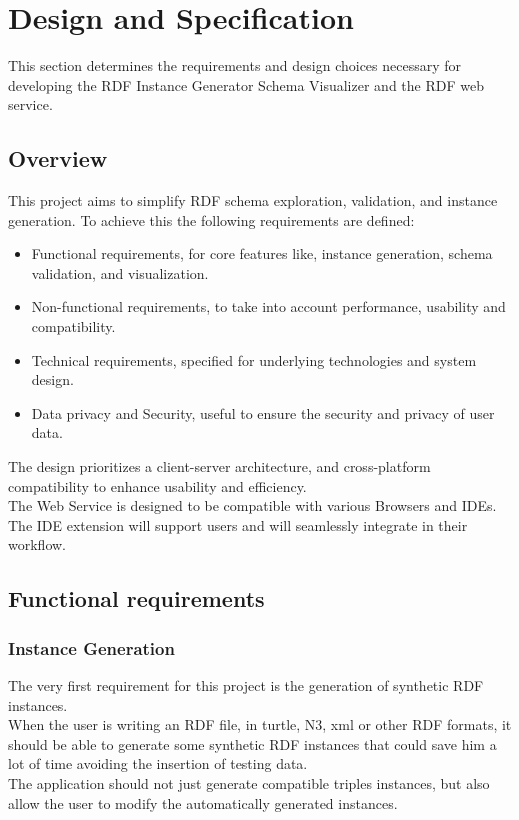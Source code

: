 \chapter{Design and Specification\label{cha:chapter3}}
This section determines the requirements and design choices necessary for developing the RDF Instance Generator Schema Visualizer and the RDF web service.

\section{Overview\label{sec:reqoverview}}

This project aims to simplify RDF schema exploration, validation, and instance generation. To achieve this the following requirements are defined: 
\begin{itemize}
    \item Functional requirements, for core features like, instance generation, schema validation, and visualization.
    \item Non-functional requirements, to take into account performance, usability and compatibility.
    \item Technical requirements, specified for underlying technologies and system design.
    \item Data privacy and Security, useful to ensure the security and privacy of user data.
\end{itemize}

The design prioritizes a client-server architecture, and cross-platform compatibility to enhance usability and efficiency. 
\\
The Web Service is designed to be compatible with various Browsers and IDEs. 
\\
The IDE extension will support users and will seamlessly integrate in their workflow.
\section{Functional requirements\label{sec:techreq}}
\subsection{Instance Generation\label{sec:reqsuba}}
The very first requirement for this project is the generation of synthetic RDF instances.
\\
When the user is writing an RDF file, in turtle, N3, xml or other RDF formats, it should be able to generate some synthetic RDF instances that could save him a lot of time avoiding the insertion of testing data.
\\
The application should not just generate compatible triples instances, but also allow the user to modify the automatically generated instances.

